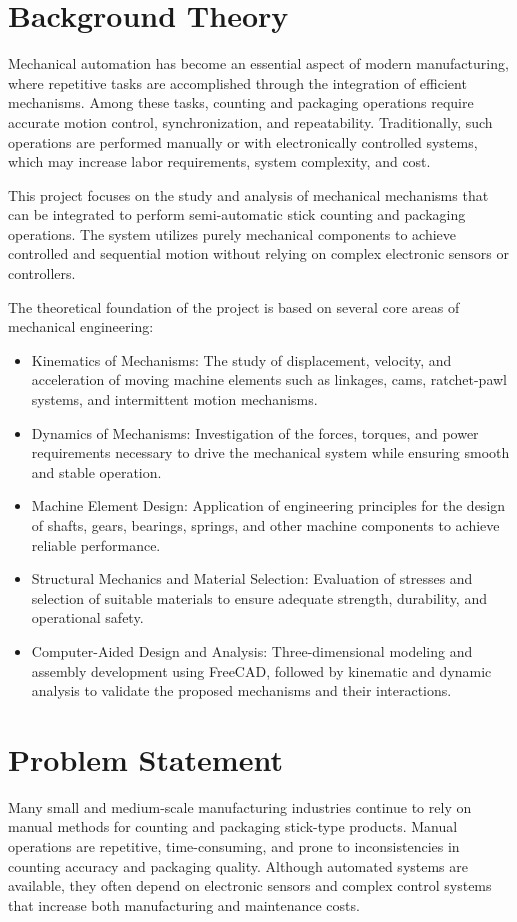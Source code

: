 \section{Background Theory}
Mechanical automation has become an essential aspect of modern manufacturing, where repetitive tasks are accomplished through the integration of efficient mechanisms. Among these tasks, counting and packaging operations require accurate motion control, synchronization, and repeatability. Traditionally, such operations are performed manually or with electronically controlled systems, which may increase labor requirements, system complexity, and cost.
\vspace{12px}

This project focuses on the study and analysis of mechanical mechanisms that can be integrated to perform semi-automatic stick counting and packaging operations. The system utilizes purely mechanical components to achieve controlled and sequential motion without relying on complex electronic sensors or controllers.
\vspace{12px}

The theoretical foundation of the project is based on several core areas of mechanical engineering:
\begin{itemize}
    \item Kinematics of Mechanisms: The study of displacement, velocity, and acceleration of moving machine elements such as linkages, cams, ratchet-pawl systems, and intermittent motion mechanisms.
    \item Dynamics of Mechanisms: Investigation of the forces, torques, and power requirements necessary to drive the mechanical system while ensuring smooth and stable operation.
    \item Machine Element Design: Application of engineering principles for the design of shafts, gears, bearings, springs, and other machine components to achieve reliable performance.
    \item Structural Mechanics and Material Selection: Evaluation of stresses and selection of suitable materials to ensure adequate strength, durability, and operational safety.
    \item Computer-Aided Design and Analysis: Three-dimensional modeling and assembly development using FreeCAD, followed by kinematic and dynamic analysis to validate the proposed mechanisms and their interactions.
\end{itemize}

\section{Problem Statement}
Many small and medium-scale manufacturing industries continue to rely on manual methods for counting and packaging stick-type products. Manual operations are repetitive, time-consuming, and prone to inconsistencies in counting accuracy and packaging quality. Although automated systems are available, they often depend on electronic sensors and complex control systems that increase both manufacturing and maintenance costs.
\vspace{12px}

